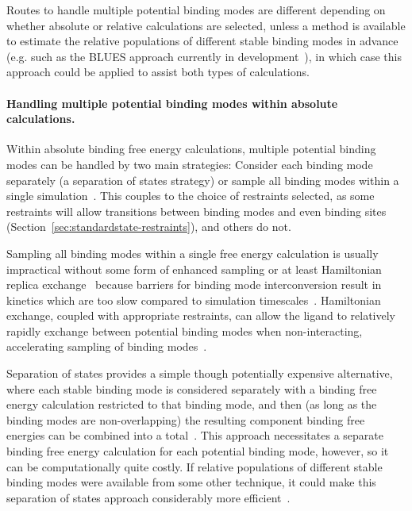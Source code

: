 \documentclass[9pt,bestpractices]{livecoms}
\begin{document}
Routes to handle multiple potential binding modes are different depending on whether absolute or relative calculations are selected, unless a method is available to estimate the relative populations of different stable binding modes in advance (e.g. such as the BLUES approach currently in development~\cite{gill2018binding}), in which case this approach could be applied to assist both types of calculations.



\paragraph{Handling multiple potential binding modes within absolute calculations.}
Within absolute binding free energy calculations, multiple potential binding modes can be handled by two main strategies: Consider each binding mode separately (a separation of states strategy) or sample all binding modes within a single simulation~\cite{mobley2012perspective}.
This couples to the choice of restraints selected, as some restraints will allow transitions between binding modes and even binding sites (Section~\ref{sec:standardstate-restraints}), and others do not.

Sampling all binding modes within a single free energy calculation is usually impractical without some form of enhanced sampling or at least Hamiltonian replica exchange~\cite{wang2013identifying} because barriers for binding mode interconversion result in kinetics which are too slow compared to simulation timescales~\cite{mobley2006use, palma2012computation,mobley2012perspective, gill2018binding}.
Hamiltonian exchange, coupled with appropriate restraints, can allow the ligand to relatively rapidly exchange between potential binding modes when non-interacting, accelerating sampling of binding modes~\cite{wang2013identifying}.

Separation of states provides a simple though potentially expensive alternative, where each stable binding mode is considered separately with a binding free energy calculation restricted to that binding mode, and then (as long as the binding modes are non-overlapping) the resulting component binding free energies can be combined into a total~\cite{mobley2006use, mobley2012perspective}.
This approach necessitates a separate binding free energy calculation for each potential binding mode, however, so it can be computationally quite costly.
If relative populations of different stable binding modes were available from some other technique, it could make this separation of states approach considerably more efficient~\cite{mobley2012perspective, gill2018binding}.
\end{document}
